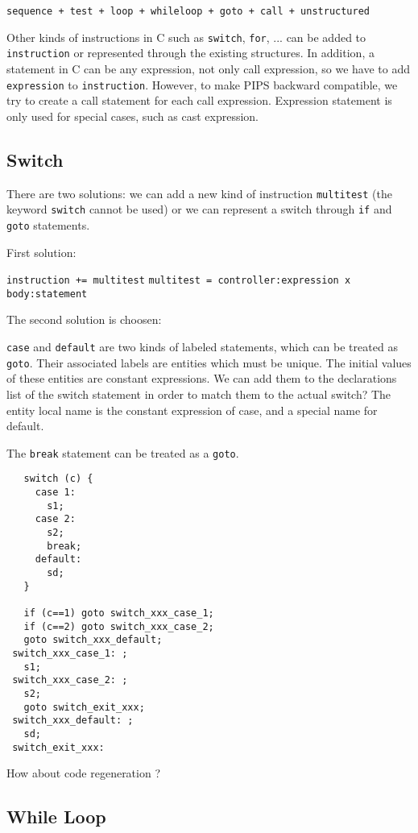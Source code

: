 \documentclass[a4paper]{report}
\begin{document}
\verb/sequence + test + loop + whileloop + goto + call + unstructured/

Other kinds of instructions in C such as \verb/switch/, \verb/for/, ... can be
added to \verb/instruction/ or represented through the existing structures. 
In addition, a statement in C can be any expression, not only call
expression, so we have to add \verb/expression/ to \verb/instruction/. 
However, to make PIPS backward compatible, we try to create a call
statement for each call expression. Expression statement is only used for
special cases, such as cast expression.
 
\subsection{Switch}

There are two solutions: we can add a new kind of instruction
\verb/multitest/ (the keyword \verb/switch/ cannot be used) or we can
represent a switch through \verb/if/ and \verb/goto/ statements.  

First solution: 

\verb/instruction += multitest/
\verb/multitest = controller:expression x body:statement/

The second solution is choosen: 
 
\verb/case/ and \verb/default/ are two kinds of labeled statements, which
can be treated as \verb/goto/. Their
associated labels are entities which must be unique.  The initial values of these
entities are constant expressions. We can add them to the
declarations list of the switch statement in order to match them to the actual
switch? The entity local name is the constant expression of case, and a
special name for default.  

The \verb/break/ statement can be treated as a \verb/goto/.

\begin{lstlisting}
   switch (c) {
     case 1:
       s1;
     case 2: 
       s2;  
       break;
     default: 
       sd;
   }

   if (c==1) goto switch_xxx_case_1;
   if (c==2) goto switch_xxx_case_2;
   goto switch_xxx_default;
 switch_xxx_case_1: ;
   s1;
 switch_xxx_case_2: ;
   s2;
   goto switch_exit_xxx;
 switch_xxx_default: ;
   sd;      
 switch_exit_xxx:
\end{lstlisting}
How about code regeneration ? 

\subsection{While Loop}
\end{document}
